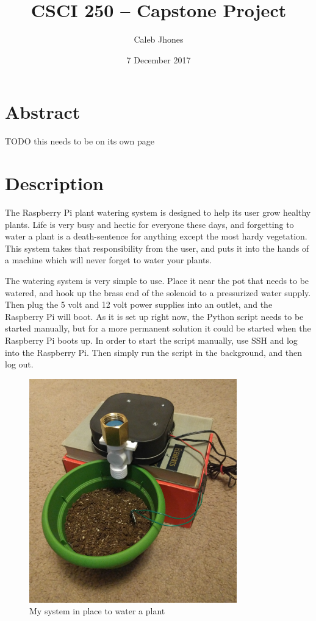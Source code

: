 \documentclass[11pt] {article}
\author{Caleb Jhones}
\date{7 December 2017}
\title{CSCI 250 -- Capstone Project}
\begin{document}
\maketitle

\section*{Abstract}
TODO this needs to be on its own page %

\newpage

\section{Description}
The Raspberry Pi plant watering system is designed to help its user grow healthy plants. Life is very busy and hectic
for everyone these days, and forgetting to water a plant is a death-sentence for anything except the most hardy
vegetation. This system takes that responsibility from the user, and puts it into the hands of a machine which will
never forget to water your plants.

The watering system is very simple to use. Place it near the pot that needs to be watered, and hook up the brass end of
the solenoid to a pressurized water supply. Then plug the 5 volt and 12 volt power supplies into an outlet, and the
Raspberry Pi will boot. As it is set up right now, the Python script needs to be started manually, but for a more permanent
solution it could be started when the Raspberry Pi boots up. In order to start the script manually, use SSH and log into
the Raspberry Pi. Then simply run the script in the background, and then log out.

\begin{figure}[H]
    \begin{centering}
        \includegraphics[width=9cm]{../img/in-use}
        \caption{My system in place to water a plant}
    \end{centering}
    \label{in-place}
\end{figure}
\end{document}

